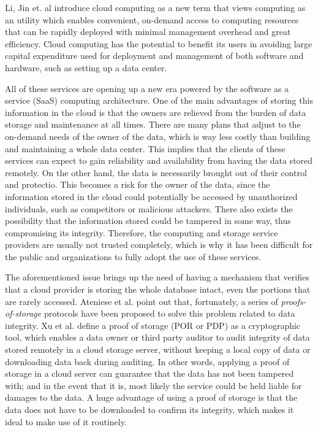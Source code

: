 Li, Jin et. al \cite{cryptoeprint:2009:593} introduce cloud computing as a new term that views computing as an utility which enables convenient, on-demand access to computing resources that can be rapidly deployed with minimal management overhead and great efficiency. Cloud computing has the potential to benefit its users in avoiding large capital expenditure used for deployment and management of both software and hardware, such as setting up a data center. 

All of these services are opening up a new era powered by the software as a service (SaaS) computing architecture. One of the main advantages of storing this information in the cloud is that the owners are relieved from the burden of data storage and maintenance at all times. There are many plans that adjust to the on-demand needs of the owner of the data, which is way less costly than building and maintaining a whole data center. This implies that the clients of these services can expect to gain reliability and availability from having the data stored remotely. On the other hand, the data is necessarily brought out of their control and protectio. This becomes a risk for the owner of the data, since the information stored in the cloud could potentially be accessed by unauthorized individuals, such as competitors or malicious attackers. There also exists the possibility that the information stored could be tampered in some way, thus compromising its integrity. Therefore, the computing and storage service providers are usually not trusted completely, which is why it has been difficult for the public and organizations to fully adopt the use of these services.

The aforementioned issue brings up the need of having a mechanism that verifies that a cloud provider is storing the whole database intact, even the portions that are rarely accessed. Ateniese et al. \cite{cryptoeprint:2014:886} point out that, fortunately, a series of \textit{proofs-of-storage} protocols have been proposed to solve this problem related to data integrity. Xu et al. \cite{cryptoeprint:2014:395} define a proof of storage (POR or PDP) as a cryptographic tool, which enables a data owner or third party auditor to audit integrity of data stored remotely in a cloud storage server, without keeping a local copy of data or downloading data back during auditing. In other words, applying a proof of storage in a cloud server can guarantee that the data has not been tampered with; and in the event that it is, most likely the service could be held liable for damages to the data. A huge advantage of using a proof of storage is that the data does not have to be downloaded to confirm its integrity, which makes it ideal to make use of it routinely. 

